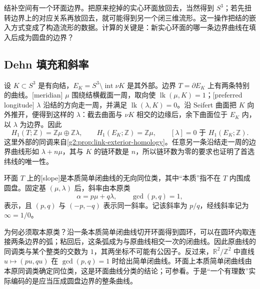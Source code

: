 结补空间有一个环面边界。把原来挖掉的实心环面放回去，当然得到 \(S^3\)；若先扭转边界上的对应关系再放回去，就可能得到另一个闭三维流形。这一操作把结的嵌入方式变成了构造流形的数据。计算的关键是：新实心环面的哪一条边界曲线在填入后成为圆盘的边界？

\subsection{Dehn 填充和斜率}
\label{g2:subsec:A03:01}

设 \(K\subset S^3\) 是有向结，\(E_K=S^3\setminus\operatorname{int}\nu K\) 是其外部。边界 \(T=\partial E_K\) 上有两条特别的曲线。[meridian] \(\mu\) 围绕结横截面一周，取向使 \(\operatorname{lk}(\mu,K)=1\)；[preferred longitude] \(\lambda\) 沿结的方向走一周，并满足 \(\operatorname{lk}(\lambda,K)=0\)。沿 Seifert 曲面把 \(K\) 向外推开，便得到这样的 \(\lambda\)：截去曲面与 \(\nu K\) 相交的边缘后，余下曲面位于 \(E_K\) 内，以 \(\lambda\) 为边界。因此
\[
	H_1(T;\mathbb Z)=\mathbb Z\mu\oplus\mathbb Z\lambda,
	\qquad H_1(E_K;\mathbb Z)=\mathbb Z\mu,
	\qquad [\lambda]=0\text{ 于 }H_1(E_K;\mathbb Z).
\]
这里外部的同调来自\cref{g2:prop:link-exterior-homology}。任意另一条沿结走一周的边界曲线形如 \(\lambda+n\mu\)，其与 \(K\) 的链环数是 \(n\)，所以链环数为零的要求也证明了首选纬线的唯一性。

\begin{definition}\label{g2:def:dehn-slope}
	环面 \(T\) 上的[slope]是本质简单闭曲线的无向同位类，其中“本质”指不在 \(T\) 内围成圆盘。固定基 \((\mu,\lambda)\) 后，斜率由本原类
	\[
		\alpha=p\mu+q\lambda,\qquad \gcd(p,q)=1,
	\]
	表示，且 \((p,q)\) 与 \((-p,-q)\) 表示同一斜率。记该斜率为 \(p/q\)，经线斜率记为 \(\infty=1/0\)。
\end{definition}

为何必须取本原类？沿一条本质简单闭曲线切开环面得到圆环，可以在圆环内取连接两条边界的弧；粘回后，这条弧成为与原曲线相交一次的闭曲线。因此原曲线的同调类与某个整类的交数为 \(1\)，其两坐标不可能有公因子。反过来，\(\mathbb R^2/\mathbb Z^2\) 中直线 \(u\mapsto (pu,qu)\) 在 \(\gcd(p,q)=1\) 时给出简单闭曲线。环面上本质简单闭曲线由本原同调类确定同位类，这是环面曲线分类的结论；可参看\cite[第2章C节]{Rolfsen2003Knots}。于是“一个有理数”实际编码的是应当压成圆盘边界的整条曲线。

